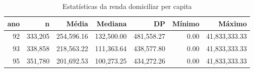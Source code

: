\begin{table}[ht]
\centering
\small  %
\caption{Estatísticas da renda domiciliar per capita}
\label{tab:renda_dom_pc}
\begin{tabular}{rrrrrrr}
  \hline
ano & n & Média & Mediana & DP & Mínimo & Máximo \\ 
  \hline
92 & 333,205 & 254,596.16 & 132,500.00 & 481,558.27 & 0.00 & 41,833,333.33  \\ 
93 & 338,858 & 218,563.22 & 111,363.64 & 438,577.80 & 0.00 & 41,833,333.33 \\ 
95 & 351,780 & 201,692.53 & 100,273.25 & 434,272.26 & 0.00 & 41,833,333.33  \\ 
  \hline
\end{tabular}
\end{table}
